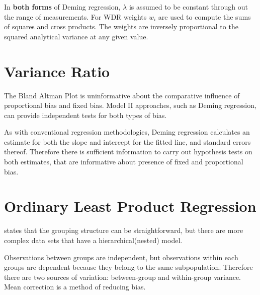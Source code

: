 \documentclass[12pt, a4paper]{report}
\theoremstyle{plain}
\theoremstyle{definition}
\theoremstyle{remark}
\begin{document}
In \textbf{both forms} of Deming regression, $\lambda$ is assumed to be constant through out the range of measurements. For WDR weights $w_{i}$ are used to compute the sums of squares and cross products. The weights are inversely proportional to the squared analytical variance at any given value.

\section{Variance Ratio}
The Bland Altman Plot is uninformative about the comparative influence of proportional bias and fixed bias. Model II approaches, such as Deming regression,  can provide independent tests for
both types of bias.


As with conventional regression methodologies, Deming regression calculates an estimate for both the slope and intercept for the
fitted line, and standard errors thereof. Therefore there is sufficient information to carry out hypothesis tests on both
estimates, that are informative about presence of fixed and proportional bias.





\section{Ordinary Least Product Regression}
\citet{ludbrook97} states that the grouping structure can be
straightforward, but there are more complex data sets that have a hierarchical(nested) model.

Observations between groups are independent, but observations
within each groups are dependent because they belong to the same
subpopulation. Therefore there are two sources of variation:
between-group and within-group variance.
 \vspace{5 mm} \noindent Mean correction is a method of reducing
bias.
\end{document}
